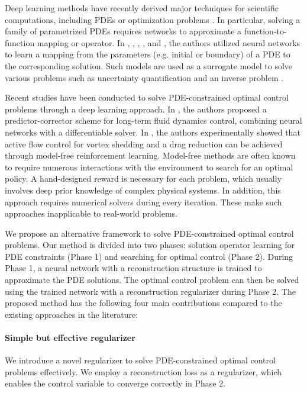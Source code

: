 \documentclass[letterpaper]{article}
\begin{document}
Deep learning methods have recently derived major techniques for scientific computations, including PDEs or optimization problems \cite{raissi2019physics}. In particular, solving a family of parametrized PDEs requires networks to approximate a function-to-function mapping or operator. In \cite{li2020fourier}, \cite{li2020neural}, \cite{lu2019deeponet}, \cite{ zhu2018bayesian}, and \cite{zhu2019physics}, the authors utilized neural networks to learn a mapping from the parameters (e.g. initial or boundary) of a PDE to the corresponding solution. Such models are used as a surrogate model to solve various problems such as uncertainty quantification \cite{zhu2018bayesian,zhu2019physics} and an inverse problem \cite{li2020fourier}.

Recent studies have been conducted to solve PDE-constrained optimal control problems through a deep learning approach. In \cite{holl2020learning}, the authors proposed a predictor-corrector scheme for long-term fluid dynamics control, combining neural networks with a differentiable solver. In \cite{rabault2019artificial}, the authors experimentally showed that active flow control for vortex shedding and a drag reduction can be achieved through model-free reinforcement learning. Model-free methods are often known to require numerous interactions with the environment to search for an optimal policy. A hand-designed reward is necessary for each problem, which usually involves deep prior knowledge of complex physical systems. In addition, this approach requires numerical solvers during every iteration. These make such approaches inapplicable to real-world problems.

We propose an alternative framework to solve PDE-constrained optimal control problems. Our method is divided into two phases: solution operator learning for PDE constraints (Phase 1) and searching for optimal control (Phase 2). During Phase 1, a neural network with a reconstruction structure is trained to approximate the PDE solutions. The optimal control problem can then be solved using the trained network with a reconstruction regularizer during Phase 2.
 The proposed method has the following four main contributions compared to the existing approaches in the literature:

\paragraph{Simple but effective regularizer}We introduce a novel regularizer to solve PDE-constrained optimal control problems effectively. We employ a reconstruction loss as a regularizer, which enables the control variable to converge correctly in Phase 2.
\end{document}
